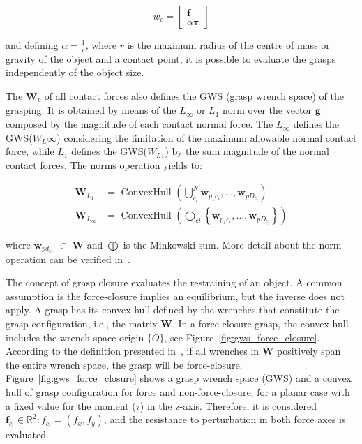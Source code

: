 \begin{equation}
	w_{c}=\left[\begin{array}{c}
		\boldsymbol{f} \\
		\alpha \boldsymbol{\tau}
	\end{array}\right]
\end{equation}

and defining $\alpha=\frac{1}{r}$, where $r$ is the maximum radius of the centre of mass or gravity of the object and a contact point, it is possible to evaluate the grasps independently of the object size.

The $\mathbf{W}_p$ of all contact forces also defines the GWS (grasp wrench space) of the grasping. It is obtained by means of the $L_\infty$ or $L_1$ norm over the vector $\mathbf{g}$ composed by the magnitude of each contact normal force. The $L_\infty$ defines the GWS($W_L\infty$) considering the limitation of the maximum allowable normal contact force, while $L_1$ defines the GWS($W_{L1}$) by the sum magnitude of the normal contact forces. The norms operation yields to:


\begin{equation}
\begin{aligned}
\mathbf{W}_{L_{1}} &=\text { ConvexHull }\left(\bigcup_{c_i}^{N} \mathbf{w}_{p_1 c_i}, \ldots, \mathbf{w}_{p D_{c_i}}\right) \\
\mathbf{W}_{L_{\infty}} &=\text { ConvexHull }\left(\bigoplus_{c i}\left\{\mathbf{w}_{p_1 c_i}, \ldots, \mathbf{w}_{p D_{c_i}}\right\}\right)
\end{aligned}
\end{equation}

\noindent
where $\mathbf{w}_{pd_{ci}}$ $\in$ $\mathbf{W}$ and $\bigoplus$ is the Minkowski sum. More detail about the norm operation can be verified in~\cite{Ferrari}.


The concept of grasp closure evaluates the restraining of an object. A common assumption is the force-closure implies an equilibrium, but the inverse does not apply. A grasp has its convex hull defined by the wrenches that constitute the grasp configuration, i.e., the matrix $\mathbf{W}$. In a force-closure grasp, the convex hull includes the wrench space origin $\{O\}$, see Figure~\ref{fig:gws_force_closure}. According to the definition presented in~\cite{salisbury1983kinematic}, if all wrenches in $\mathbf{W}$ positively span the entire wrench space, the grasp will be force-closure. Figure~\ref{fig:gws_force_closure} shows a  grasp wrench space (GWS) and a convex hull of grasp configuration for force and non-force-closure, for a planar case with a fixed value for the moment ($\tau$) in the z-axis. Therefore, it is considered $\mathbf{f}_{c_i} \in  \mathbb{R}^2:  {f}_{c_i}  = (f_{x} , f_{y})$, and  the resistance to perturbation in both force axes is evaluated. 

